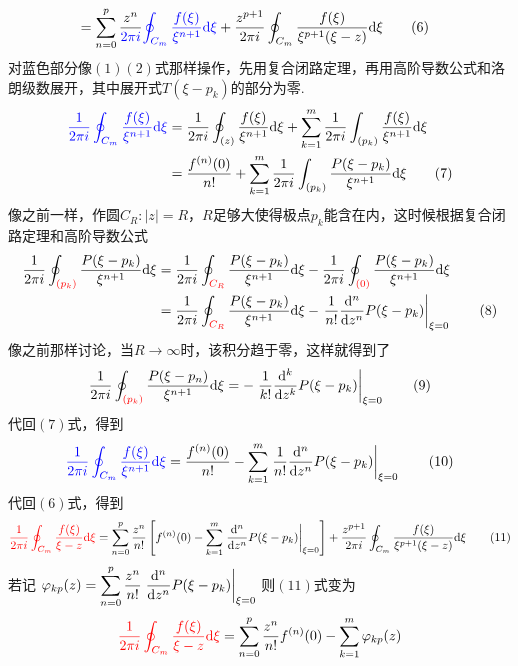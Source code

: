 {\begin{align}
    &= \sum_{n=0}^{p}\frac{z^n}{\color{blue}2\pi i}{\color{blue}\oint_{C_m}\frac{f(\xi)}{\xi^{n+1}}{\rm d}\xi}
    +\frac{z^{p+1}}{2\pi i}\oint_{C_m}\frac{f(\xi)}{\xi^{p+1}(\xi-z)}{\rm d}\xi \tag{6}
\end{align}
对蓝色部分像\((1)(2)\)式那样操作，先用复合闭路定理，再用高阶导数公式和洛朗级数展开，其中展开式\(T(\xi-p_k)\)的部分为零.
\begin{align}
    {\color{blue}\frac{1}{2\pi i}\oint_{C_m}\frac{f(\xi)}{\xi^{n+1}}{\rm d}\xi} &= 
    \frac{1}{2\pi i}\oint_{(z)}\frac{f(\xi)}{\xi^{n+1}}{\rm d}\xi
    +\sum_{k=1}^m\frac{1}{2\pi i}\int_{(p_k)}\frac{f(\xi)}{\xi^{n+1}}{\rm d}\xi \notag \\ 
    &= \frac{f^{(n)}(0)}{n!} + \sum_{k=1}^m\frac{1}{2\pi i}\int_{(p_k)}\frac{P(\xi-p_k)}{\xi^{n+1}}{\rm d}\xi \tag{7}
\end{align}
像之前一样，作圆\(C_R:|z|=R\)，\(R\)足够大使得极点\(p_k\)能含在内，这时候根据复合闭路定理和高阶导数公式
\begin{align}
    \frac{1}{2\pi i}\oint_{\color{red}(p_k)}\frac{P(\xi-p_k)}{\xi^{n+1}}{\rm d}\xi &= 
    \frac{1}{2\pi i}\oint_{\color{red}C_R}\frac{P(\xi-p_k)}{\xi^{n+1}}{\rm d}\xi
    - \frac{1}{2\pi i}\oint_{\color{red}(0)}\frac{P(\xi-p_k)}{\xi^{n+1}}{\rm d}\xi \notag \\
    &= \frac{1}{2\pi i}\oint_{\color{red}C_R}\frac{P(\xi-p_k)}{\xi^{n+1}}{\rm d}\xi 
    - \left.\frac{1}{n!}\frac{{\rm d}^{n}}{{\rm d}z^n}P(\xi-p_k)\right|_{\xi=0}
    \tag{8}
\end{align}
像之前那样讨论，当\(R \to \infty\)时，该积分趋于零，这样就得到了
\[\frac{1}{2\pi i}\oint_{\color{red}(p_k)}\frac{P(\xi-p_n)}{\xi^{n+1}}{\rm d}\xi = -\left.\frac{1}{k!}\frac{{\rm d}^{k}}{{\rm d}z^k}P(\xi-p_k)\right|_{\xi=0} \tag{9}\]
代回\((7)\)式，得到
\[{\color{blue}\frac{1}{2\pi i}\oint_{C_m}\frac{f(\xi)}{\xi^{n+1}}{\rm d}\xi} = \frac{f^{(n)}(0)}{n!} - \sum_{k=1}^m\left.\frac{1}{n!}\frac{{\rm d}^{n}}{{\rm d}z^n}P(\xi-p_k)\right|_{\xi=0} \tag{10}\]
代回\((6)\)式，得到
\[{\color{red} \frac{1}{2\pi i}\oint_{C_m}\frac{f(\xi)}{\xi-z}{\rm d}\xi} = 
\sum_{n=0}^{p}\frac{z^n}{n!}\left[f^{(n)}(0) - \sum_{k=1}^m\left.\frac{{\rm d}^{n}}{{\rm d}z^n}P(\xi-p_k)\right|_{\xi=0}\right]
+\frac{z^{p+1}}{2\pi i}\oint_{C_m}\frac{f(\xi)}{\xi^{p+1}(\xi-z)}{\rm d}\xi \tag{11}\]
若记
\(\displaystyle{\varphi_{kp}(z)=\sum_{n=0}^{p}\frac{z^n}{n!}\left.\frac{{\rm d}^{n}}{{\rm d}z^n}P(\xi-p_k)\right|_{\xi=0}}\)
则\((11)\)式变为
\[{\color{red} \frac{1}{2\pi i}\oint_{C_m}\frac{f(\xi)}{\xi-z}{\rm d}\xi} = 
\sum_{n=0}^{p}\frac{z^n}{n!}f^{(n)}(0) - \sum_{k=1}^m\varphi_{kp}(z)
\]}
